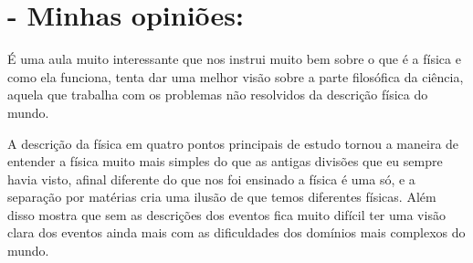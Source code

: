 \documentclass [a4paper, 12pt]{article}
\begin{document}
\section*{- Minhas opiniões:}

É uma aula muito interessante que nos instrui muito bem sobre o que é a física e como ela funciona, tenta dar uma melhor visão sobre a parte filosófica da ciência, aquela que trabalha com os problemas não resolvidos da descrição física do mundo.

A descrição da física em quatro pontos principais de estudo tornou a maneira de entender a física muito mais simples do que as antigas divisões que eu sempre havia visto, afinal diferente do que nos foi ensinado a física é uma só, e a separação por matérias cria uma ilusão de que temos diferentes físicas. Além disso mostra que sem as descrições dos eventos fica muito difícil ter uma visão clara dos eventos ainda mais com as dificuldades dos domínios mais complexos do mundo.
\end{document}
